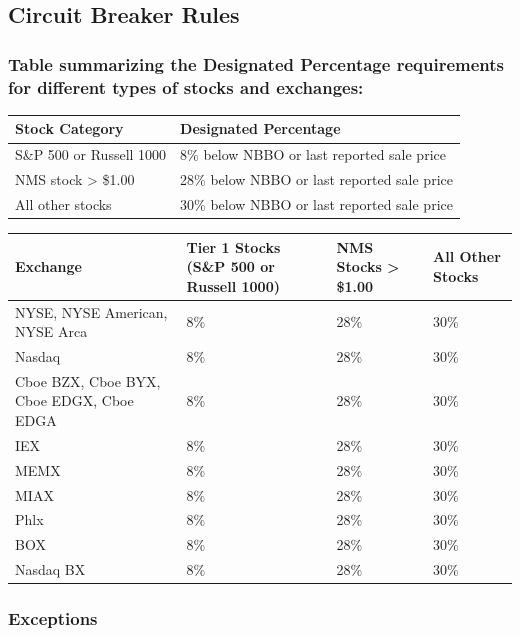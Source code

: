 \documentclass[11pt]{article}
\begin{document}
\subsection{Circuit Breaker Rules}
\label{sec:org0a279d0}
\subsubsection{Table summarizing the Designated Percentage requirements for different types of stocks and exchanges:}
\label{sec:org3a30965}

\begin{center}
\begin{tabular}{ll}
\hline
Stock Category & Designated Percentage\\[0pt]
\hline
S\&P 500 or Russell 1000 & 8\% below NBBO or last reported sale price\\[0pt]
NMS stock > \$1.00 & 28\% below NBBO or last reported sale price\\[0pt]
All other stocks & 30\% below NBBO or last reported sale price\\[0pt]
\hline
\end{tabular}
\end{center}

\begin{center}
\begin{tabular}{llll}
\hline
Exchange & Tier 1 Stocks (S\&P 500 or Russell 1000) & NMS Stocks > \$1.00 & All Other Stocks\\[0pt]
\hline
NYSE, NYSE American, NYSE Arca & 8\% & 28\% & 30\%\\[0pt]
Nasdaq & 8\% & 28\% & 30\%\\[0pt]
Cboe BZX, Cboe BYX, Cboe EDGX, Cboe EDGA & 8\% & 28\% & 30\%\\[0pt]
IEX & 8\% & 28\% & 30\%\\[0pt]
MEMX & 8\% & 28\% & 30\%\\[0pt]
MIAX & 8\% & 28\% & 30\%\\[0pt]
Phlx & 8\% & 28\% & 30\%\\[0pt]
BOX & 8\% & 28\% & 30\%\\[0pt]
Nasdaq BX & 8\% & 28\% & 30\%\\[0pt]
\hline
\end{tabular}
\end{center}

\subsubsection{Exceptions}
\label{sec:orgdaf5254}
\end{document}
